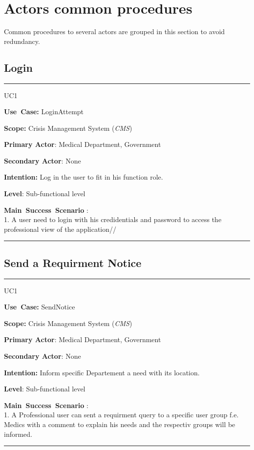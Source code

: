 \section{Actors common procedures}
Common procedures to several actors are grouped in this section to avoid
redundancy.

\subsection{Login}
\vspace{0.5cm}
\hrule
\vspace{0.5cm}
\begin{lyxlist}{UC1}
\small{
\item [\textbf{Use~Case:}] LoginAttempt
\item [\textbf{Scope:}] Crisis Management System (\emph{CMS})
\item [\textbf{Primary Actor}:] Medical Department, Government
\item [\textbf{Secondary Actor}:] None
\item [\textbf{Intention:}] Log in the user to fit in his function role.
\item [\textbf{Level}:]Sub-functional level
\item [\textbf{Main~Success~Scenario}]:\\
1. A user need to login with his credidentials and password to access the
professional view of the application// 
}
\end{lyxlist}
\hrule 
\vspace{0.5cm} 

\subsection{Send a Requirment Notice}
\vspace{0.5cm}
\hrule
\vspace{0.5cm}
\begin{lyxlist}{UC1}
\small{
\item [\textbf{Use~Case:}] SendNotice
\item [\textbf{Scope:}] Crisis Management System (\emph{CMS})
\item [\textbf{Primary Actor}:] Medical Department, Government
\item [\textbf{Secondary Actor}:] None
\item [\textbf{Intention:}] Inform specific Departement a need with its
location.
\item [\textbf{Level}:]Sub-functional level
\item [\textbf{Main~Success~Scenario}]:\\
1. A Professional user can sent a requirment query to a specific user group
f.e. Medics with a comment to explain his needs and the respectiv groups will
be informed. \\
}
\end{lyxlist}
\hrule 
\vspace{0.5cm} 


